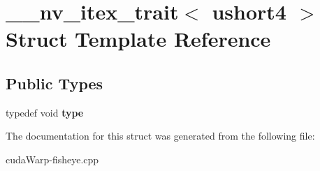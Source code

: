 \hypertarget{struct____nv__itex__trait_3_01ushort4_01_4}{}\section{\+\_\+\+\_\+nv\+\_\+itex\+\_\+trait$<$ ushort4 $>$ Struct Template Reference}
\label{struct____nv__itex__trait_3_01ushort4_01_4}
\subsection*{Public Types}
\begin{DoxyCompactItemize}
\item 
typedef void {\bfseries type}\hypertarget{struct____nv__itex__trait_3_01ushort4_01_4_aa10a844e45b04d68e47a3fda30ffba9d}{}\label{struct____nv__itex__trait_3_01ushort4_01_4_aa10a844e45b04d68e47a3fda30ffba9d}

\end{DoxyCompactItemize}


The documentation for this struct was generated from the following file\+:\begin{DoxyCompactItemize}
\item 
cuda\+Warp-\/fisheye.\+cpp\end{DoxyCompactItemize}
